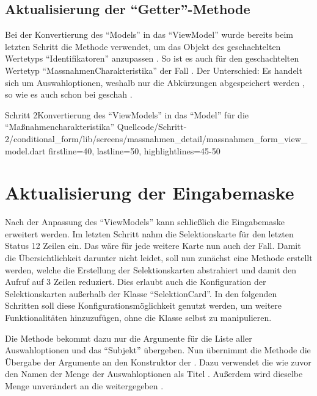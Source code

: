\subsection{Aktualisierung der \enquote{Getter}-Methode}

Bei der Konvertierung des \enquote{Models} in das \enquote{ViewModel} wurde bereits beim letzten Schritt die Methode  verwendet,
um das Objekt des geschachtelten Wertetyps \enquote{Identifikatoren} anzupassen .
So ist es auch für den geschachtelten Wertetyp \enquote{MassnahmenCharakteristika} der Fall .
Der Unterschied: Es handelt sich um Auswahloptionen, weshalb nur die Abkürzungen abgespeichert werden , so wie es auch schon bei  geschah .

\begin{alexlisting}{Schritt 2}{Konvertierung des \enquote{ViewModels} in das \enquote{Model} für die \enquote{Maßnahmencharakteristika}}
  {Quellcode/Schritt-2/conditional_form/lib/screens/massnahmen_detail/massnahmen_form_view_model.dart}
  {firstline=40, lastline=50, highlightlines={45-50}}
  \label{lst:Schritt2KonvertierungDesViewModelsInDasModel}
\end{alexlisting}

\section{Aktualisierung der Eingabemaske}

Nach der Anpassung des \enquote{ViewModels} kann schließlich die Eingabemaske erweitert werden.
Im letzten Schritt nahm die Selektionskarte für den letzten Status 12 Zeilen ein. 
Das wäre für jede weitere Karte nun auch der Fall.
Damit die Übersichtlichkeit darunter nicht leidet, soll nun zunächst eine Methode erstellt werden, welche die Erstellung der Selektionskarten abstrahiert und damit den Aufruf auf 3 Zeilen reduziert.
Dies erlaubt auch die Konfiguration der Selektionskarten außerhalb der Klasse \enquote{SelektionCard}.
In den folgenden Schritten soll diese Konfigurationsmöglichkeit genutzt werden, um weitere Funktionalitäten hinzuzufügen, ohne die Klasse selbst zu manipulieren.

\clearpage
Die Methode  bekommt dazu nur die Argumente für die Liste aller Auswahloptionen 
und das \enquote{Subjekt}   übergeben.
Nun übernimmt die Methode die Übergabe der Argumente an den Konstruktor der  .
Dazu verwendet die  wie zuvor den Namen der Menge der Auswahloptionen als Titel .
Außerdem wird dieselbe Menge unverändert an die  weitergegeben .

